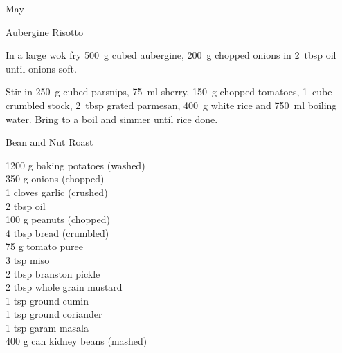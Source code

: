 \begin{menu}{May}
\begin{recipe}{2}{Aubergine Risotto}
\begin{ingredients}
		\end{ingredients}
	
	
    \begin{instructions}
    \item 
        In a large wok fry
        500~g cubed aubergine,
        200~g chopped onions
        in
        2~tbsp  oil
        until onions soft.
      \item 
        Stir in
        250~g cubed parsnips,
        75~ml  sherry,
        150~g chopped tomatoes,
        1~cube crumbled stock,
        2~tbsp grated parmesan,
        400~g  white rice
        and
        750~ml  boiling water.
        Bring to a boil and simmer until rice done.
      
    \end{instructions}
    \end{recipe}%
  
    \begin{recipe}{2}{Bean and Nut Roast}%
		\begin{ingredients}
		1200 g baking potatoes (washed) \\
	350 g onions (chopped) \\
	1 cloves garlic (crushed) \\
	2 tbsp oil  \\
	100 g peanuts (chopped) \\
	4 tbsp bread (crumbled) \\
	75 g tomato puree  \\
	3 tsp miso  \\
	2 tbsp branston pickle  \\
	2 tbsp whole grain mustard  \\
	1 tsp ground cumin  \\
	1 tsp ground coriander  \\
	1 tsp garam masala  \\
	400 g can kidney beans (mashed) \\
	
		\end{ingredients}
	
	

\end{recipe}
\end{menu}

